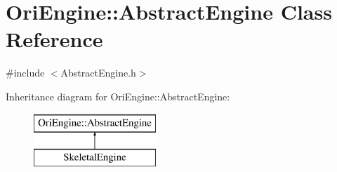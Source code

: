 \hypertarget{class_ori_engine_1_1_abstract_engine}{}\section{Ori\+Engine\+:\+:Abstract\+Engine Class Reference}
\label{class_ori_engine_1_1_abstract_engine}


{\ttfamily \#include $<$Abstract\+Engine.\+h$>$}

Inheritance diagram for Ori\+Engine\+:\+:Abstract\+Engine\+:\begin{figure}[H]
\begin{center}
\leavevmode
\includegraphics[height=2.000000cm]{class_ori_engine_1_1_abstract_engine}
\end{center}
\end{figure}
